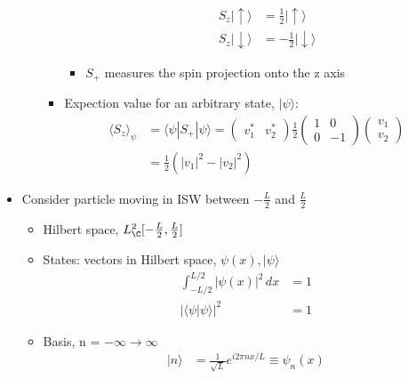 \documentclass[cplx.tex]{subfiles}
\begin{document}
\begin{itemize}
\begin{enumerate}
\begin{itemize}
\begin{itemize}
                                \begin{align}
                                    S_z|\uparrow\rangle &= \frac{1}{2}|\uparrow\rangle \\
                                    S_z|\downarrow\rangle &= -\frac{1}{2}|\downarrow\rangle
                                \end{align}
                            \item $S_+$ measures the spin projection onto the z axis
                        \end{itemize}
                    \item Expection value for an arbitrary state, $|\psi\rangle$:
                        \begin{align}
                            \langle S_z\rangle_\psi &= \langle\psi| S_+|\psi\rangle = \begin{pmatrix} v_1^* & v_2^*\end{pmatrix} \frac{1}{2} \begin{pmatrix} 1 & 0 \\ 0 & -1 \end{pmatrix} \begin{pmatrix} v_1 \\ v_2 \end{pmatrix} \\
                                                    &= \frac{1}{2} (|v_1|^2 - |v_2|^2)
                        \end{align}
                \end{itemize}
        \end{enumerate}
    \item Consider particle moving in ISW between $-\frac L2$ and $\frac L2$
        \begin{itemize}
            \item Hilbert space, $L^2_{\C}[-\frac L2, \frac L2]$
            \item States: vectors in Hilbert space, $\psi(x), |\psi\rangle$
                \begin{align}
                    \int_{-L/2}^{L/2} |\psi(x)|^2\,dx &= 1 \\
                    |\langle\psi|\psi\rangle|^2 &= 1
                \end{align}
            \item Basis, n = $-\infty \to \infty$
                \begin{align}
                    |n\rangle &= \frac{1}{\sqrt{L}} e^{i2\pi nx/L} \equiv \psi_n(x)

\end{align}
\end{itemize}
\end{itemize}
\end{document}
